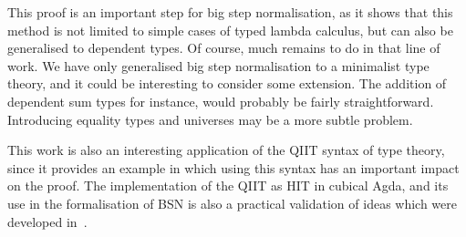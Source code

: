 \documentclass[a4paper,UKenglish,cleveref]{lipics-v2019}
\begin{document}
This proof is an important step for big step normalisation, as it shows that
this method is not limited to simple cases of typed lambda calculus, but can
also be generalised to dependent types. Of course, much remains to do in that
line of work. We have only generalised big step normalisation to a minimalist
type theory, and it could be interesting to consider some extension.
The addition of dependent sum types for instance, would probably be fairly
straightforward. Introducing equality types and universes may be a more subtle
problem.

This work is also an interesting application of the QIIT syntax of type theory,
since it provides an example in which using this syntax has an important impact
on the proof. The implementation of the QIIT as HIT in cubical Agda, and its use
in the formalisation of BSN is also a practical validation of ideas which were
developed in~\cite{kaposi2016type}.


\end{document}
